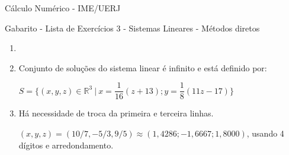 \documentclass[a4paper,12pt,fleqn]{article}
\begin{document}
\begin{center}

{\color{blue}

\large
Cálculo Numérico - IME/UERJ 

Gabarito - Lista de Exercícios 3 - Sistemas Lineares - Métodos diretos

}
\end{center}

\vspace{0.8cm}

  
  \begin{enumerate}
  
  \item 
  
       
  
  \item
  
  {\color{blue}
  
  Conjunto de soluções do sistema linear é infinito e está definido por:
     
     $S = \Big\{ (x,y,z) \in \mathds{R}^3 ~\Big \vert ~ x = \dfrac{1}{16}(z+13) ; y = \dfrac{1}{8} (11z - 17) \Big\} $
     
  }
  
  \item 
     
  {\color{blue} Há necessidade de troca da primeira e terceira linhas. 
     
     $(x, y, z) = (10/7, -5/3, 9/5) \approx (1,4286; -1,6667; 1,8000)$, usando 4 dígitos e arredondamento.
     
  }
     

\end{enumerate}
\end{document}
